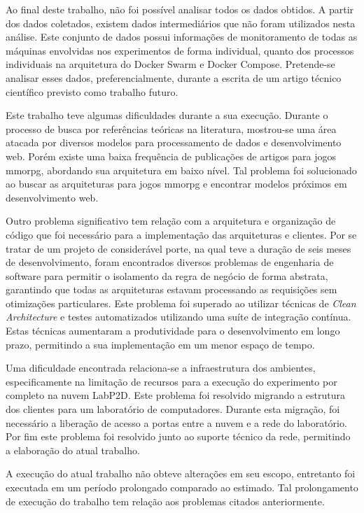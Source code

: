 Ao final deste trabalho, não foi possível analisar todos os dados obtidos.
%
A partir dos dados coletados, existem dados intermediários que não foram utilizados nesta análise.
%
Este conjunto de dados possui informações de monitoramento de todas as máquinas envolvidas nos experimentos de forma individual, quanto dos processos individuais na arquitetura do Docker Swarm e Docker Compose.
%
Pretende-se analisar esses dados, preferencialmente, durante a escrita de um artigo técnico científico previsto como trabalho futuro.

Este trabalho teve algumas dificuldades durante a sua execução.
%
Durante o processo de busca por referências teóricas na literatura, mostrou-se uma área atacada por diversos modelos para processamento de dados e desenvolvimento web.
%
Porém existe uma baixa frequência de publicações de artigos para jogos \ac{mmorpg}, abordando sua arquitetura em baixo nível.
%
Tal problema foi solucionado ao buscar as arquiteturas para jogos \ac{mmorpg} e encontrar modelos próximos em desenvolvimento web.

Outro problema significativo tem relação com a arquitetura e organização de código que foi necessário para a implementação das arquiteturas e clientes.
%
Por se tratar de um projeto de considerável porte, na qual teve a duração de seis meses de desenvolvimento, foram encontrados diversos problemas de engenharia de software para permitir o isolamento da regra de negócio de forma abstrata, garantindo que todas as arquiteturas estavam processando as requisições sem otimizações particulares.
%
Este problema foi superado ao utilizar técnicas de \textit{Clean Architecture} e testes automatizados utilizando uma suíte de integração contínua.
%
Estas técnicas aumentaram a produtividade para o desenvolvimento em longo prazo, permitindo a sua implementação em um menor espaço de tempo.
%

Uma dificuldade encontrada relaciona-se a infraestrutura dos ambientes, especificamente na limitação de recursos para a execução do experimento por completo na nuvem LabP2D.
%
Este problema foi resolvido migrando a estrutura dos clientes para um laboratório de computadores.
%
Durante esta migração, foi necessário a liberação de acesso a portas entre a nuvem e a rede do laboratório.
%
Por fim este problema foi resolvido junto ao suporte técnico da rede, permitindo a elaboração do atual trabalho.

A execução do atual trabalho não obteve alterações em seu escopo, entretanto foi executada em um período prolongado comparado ao estimado.
%
Tal prolongamento de execução do trabalho tem relação aos problemas citados anteriormente.

